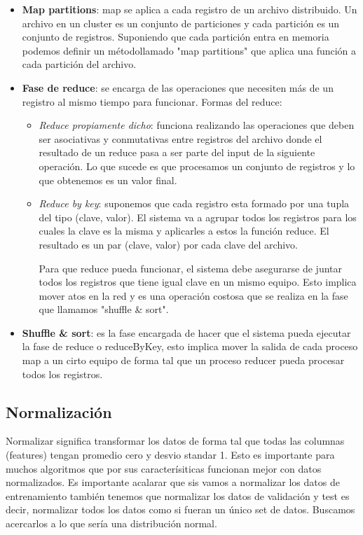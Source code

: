 \documentclass[titlepage,a4paper]{article}
\begin{document}
\begin{itemize}
\item \textbf{Map partitions}: map se aplica a cada registro de un archivo distribuido. Un archivo en un cluster es un conjunto de particiones y cada partición es un conjunto de registros. Suponiendo que cada partición entra en memoria podemos definir un métodollamado "map partitions" que aplica una función a cada partición del archivo. 
\item \textbf{Fase de reduce}: se encarga de las operaciones que necesiten más de un registro al mismo tiempo para funcionar. Formas del reduce: 
\begin{itemize}
\item \textit{Reduce propiamente dicho}: funciona realizando las operaciones que deben ser asociativas y conmutativas entre registros del archivo donde el resultado de un reduce pasa a ser parte del input de la siguiente operación.  Lo que sucede es que procesamos un conjunto de registros y lo que obtenemos es un valor final. 
\item\textit{Reduce by key}: suponemos que cada registro esta formado por una tupla del tipo (clave, valor). El sistema va a agrupar todos los registros para los cuales la clave es la misma y aplicarles a estos la función reduce. El resultado es un par (clave, valor) por cada clave del archivo.

 Para que reduce pueda funcionar, el sistema debe asegurarse de juntar todos los registros que tiene igual clave en un mismo equipo. Esto implica mover atos en la red y es una operación costosa que se realiza en la fase que llamamos "shuffle \& sort". 
\end{itemize}
\item \textbf{Shuffle \& sort}: es la fase encargada de hacer que el sistema pueda ejecutar la fase de reduce o reduceByKey, esto implica mover la salida de cada proceso map a un cirto equipo de forma tal que un proceso reducer pueda procesar todos los registros. 
\end{itemize}
\subsection*{Normalización}
Normalizar significa transformar los datos de forma tal que todas las columnas (features) tengan promedio cero y desvio standar 1. Esto es importante para muchos algoritmos que por sus caracterísiticas funcionan mejor con datos normalizados. Es importante acalarar que sis vamos a normalizar los datos de entrenamiento también tenemos que normalizar los datos de validación y test es decir, normalizar todos los datos como si fueran un único set de datos. Buscamos acercarlos a lo que sería una distribución normal. 
\end{document}
